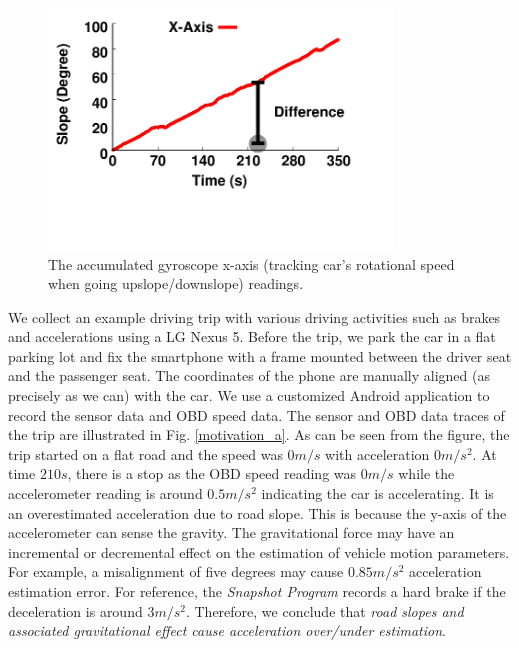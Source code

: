 \begin{figure}[ht]
\centering
\includegraphics[width=3.6in,angle=0]{Figs/DriveSense/slopeaware/gyro_motivation.pdf}
 \vspace{-1.5cm}
\caption{The accumulated gyroscope x-axis (tracking car's rotational speed when going upslope/downslope) readings.}
\vspace{-0.2cm}
\label{motivation_b}    
\centering
\end{figure}



We collect an example driving trip with various driving activities 
such as brakes and accelerations using a LG Nexus 5.
Before the trip, we park the car in a flat parking lot and fix
the smartphone with a frame mounted between the driver seat
and the passenger seat.
The coordinates of the phone are manually aligned (as precisely as we can) with the car. 
We use a customized Android application to record the sensor data and OBD speed data.
The sensor and OBD data traces of the trip are illustrated in Fig. \ref{motivation_a}.
As can be seen from the figure, the trip started on a flat road
and the speed was $0m/s$ with acceleration $0m/s^2$. 
At time $210s$, there is a stop as the OBD speed reading was $0m/s$ 
while the accelerometer reading is around $0.5m/s^2$ indicating
the car is accelerating. It is an overestimated acceleration
due to road slope.
This is because the y-axis of the accelerometer can sense the gravity. 
The gravitational force may have an incremental or decremental effect
on the estimation of vehicle motion parameters. 
For example, a misalignment of five degrees may cause $0.85m/s^2$ 
acceleration estimation error.
For reference, the \emph{Snapshot Program} \cite{snapshot} records a hard brake if the deceleration is around $3m/s^2$.
Therefore, we conclude that \emph{road slopes and associated gravitational effect
cause acceleration over/under estimation}. 


